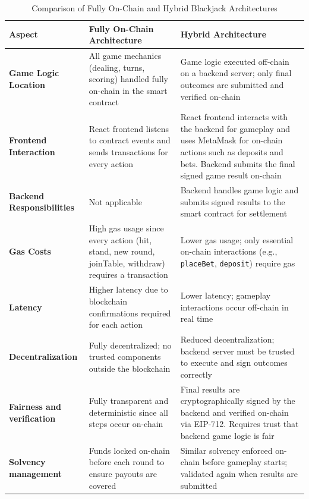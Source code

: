 \documentclass[10pt,conference]{IEEEtran}
\begin{document}
\begin{table}[h!]
\centering
\caption{Comparison of Fully On-Chain and Hybrid Blackjack Architectures}
\label{table:hybrid_vs_onchian}
\begin{tabular}{|p{3.2cm}|p{5.5cm}|p{5.5cm}|}
\hline
\textbf{Aspect} & \textbf{Fully On-Chain Architecture} & \textbf{Hybrid Architecture} \\
\hline

\textbf{Game Logic Location} &
All game mechanics (dealing, turns, scoring) handled fully on-chain in the smart contract &
Game logic executed off-chain on a backend server; only final outcomes are submitted and verified on-chain \\
\hline

\textbf{Frontend Interaction} &
React frontend listens to contract events and sends transactions for every action &
React frontend interacts with the backend for gameplay and uses MetaMask for on-chain actions such as deposits and bets. Backend submits the final signed game result on-chain \\
\hline

\textbf{Backend Responsibilities} &
Not applicable &
Backend handles game logic and submits signed results to the smart contract for settlement \\
\hline

\textbf{Gas Costs} &
High gas usage since every action (hit, stand, new round, joinTable, withdraw) requires a transaction &
Lower gas usage; only essential on-chain interactions (e.g., \texttt{placeBet}, \texttt{deposit}) require gas \\
\hline

\textbf{Latency} &
Higher latency due to blockchain confirmations required for each action &
Lower latency; gameplay interactions occur off-chain in real time \\
\hline

\textbf{Decentralization} &
Fully decentralized; no trusted components outside the blockchain &
Reduced decentralization; backend server must be trusted to execute and sign outcomes correctly \\
\hline

\textbf{Fairness and verification} &
Fully transparent and deterministic since all steps occur on-chain &
Final results are cryptographically signed by the backend and verified on-chain via EIP-712. Requires trust that backend game logic is fair \\
\hline

\textbf{Solvency management} &
Funds locked on-chain before each round to ensure payouts are covered &
Similar solvency enforced on-chain before gameplay starts; validated again when results are submitted \\
\hline


\end{tabular}
\end{table}
\end{document}
